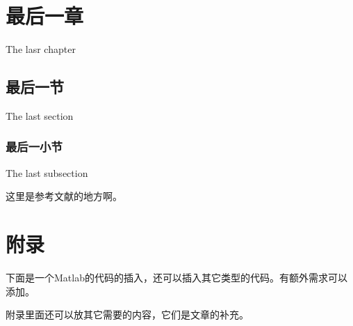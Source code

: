 \documentclass[openany,12pt]{ctexbook} %
\begin{document}
\chapter{最后一章}{The lasr chapter}
\section{最后一节}{The last section}
\subsection{最后一小节}{The last subsection}
%
%

\backmatter

%
这里是参考文献的地方啊。
\newpage
\appendix
{}
\chapter*{附录}

下面是一个Matlab的代码的插入，还可以插入其它类型的代码。有额外需求可以添加。


附录里面还可以放其它需要的内容，它们是文章的补充。
%
\end{document}
